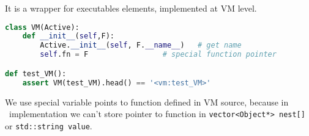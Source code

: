 \label{VMcommand}

It is a wrapper for executables elements, implemented at VM level.
\begin{lstlisting}[language=Python]
class VM(Active):
	def __init__(self,F):
		Active.__init__(self, F.__name__)   # get name
		self.fn = F					# special function pointer

def test_VM():
	assert VM(test_VM).head() == '<vm:test_VM>'
\end{lstlisting}

\noindent
We use special variable points to function defined in VM source, because in
\cpp\ implementation we can't store pointer to function in
\verb|vector<Object*> nest[]| or \verb|std::string value|.
